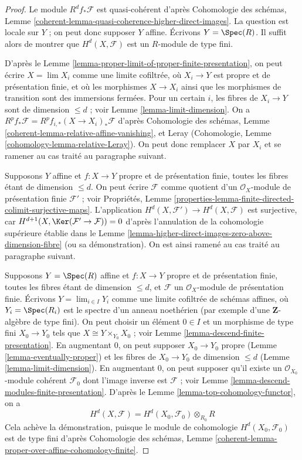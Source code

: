 \begin{proof}
Le module $R^df_*\mathcal{F}$ est quasi-cohérent d'après
Cohomologie des schémas, Lemme
\ref{coherent-lemma-quasi-coherence-higher-direct-images}.
La question est locale sur $Y$ ; on peut donc supposer $Y$ affine.
Écrivons $Y = \Spec(R)$. Il suffit alors de montrer que $H^d(X, \mathcal{F})$
est un $R$-module de type fini.

\medskip\noindent
D'après le Lemme \ref{lemma-proper-limit-of-proper-finite-presentation},
on peut écrire $X = \lim X_i$ comme une limite cofiltrée, où $X_i \to Y$ est propre
et de présentation finie, et où les morphismes $X \to X_i$
ainsi que les morphismes de transition sont des immersions fermées.
Pour un certain $i$, les fibres de $X_i \to Y$ sont de dimension $\leq d$ ;
voir Lemme \ref{lemma-limit-dimension}. On a
$R^pf_*\mathcal{F} = R^pf_{i, *}(X \to X_i)_*\mathcal{F}$ d'après
Cohomologie des schémas, Lemme \ref{coherent-lemma-relative-affine-vanishing},
et Leray (Cohomologie, Lemme \ref{cohomology-lemma-relative-Leray}).
On peut donc remplacer $X$ par $X_i$ et
se ramener au cas traité au paragraphe suivant.

\medskip\noindent
Supposons $Y$ affine et $f : X \to Y$ propre et de présentation finie,
toutes les fibres étant de dimension $\leq d$.
On peut écrire $\mathcal{F}$ comme quotient d'un
$\mathcal{O}_X$-module de présentation finie $\mathcal{F}'$ ; voir
Propriétés, Lemme
\ref{properties-lemma-finite-directed-colimit-surjective-maps}.
L'application $H^d(X, \mathcal{F}') \to H^d(X, \mathcal{F})$ est
surjective, car $H^{d + 1}(X, \Ker(\mathcal{F}' \to \mathcal{F})) = 0$
d'après l'annulation de la cohomologie supérieure établie dans le
Lemme \ref{lemma-higher-direct-images-zero-above-dimension-fibre}
(ou sa démonstration). On est ainsi ramené au cas traité au paragraphe suivant.

\medskip\noindent
Supposons $Y = \Spec(R)$ affine et $f : X \to Y$
propre et de présentation finie,
toutes les fibres étant de dimension $\leq d$, et $\mathcal{F}$ un
$\mathcal{O}_X$-module de présentation finie.
Écrivons $Y = \lim_{i \in I} Y_i$ comme une limite cofiltrée de schémas affines,
où $Y_i = \Spec(R_i)$ est le spectre d'un anneau noethérien
(par exemple d'une $\mathbf{Z}$-algèbre de type fini).
On peut choisir un élément $0 \in I$ et un morphisme de type fini
$X_0 \to Y_0$ tels que $X \cong Y \times_{Y_0} X_0$ ; voir
Lemme \ref{lemma-descend-finite-presentation}.
En augmentant $0$, on peut supposer $X_0 \to Y_0$ propre
(Lemme \ref{lemma-eventually-proper})
et les fibres de $X_0 \to Y_0$ de dimension $\leq d$
(Lemme \ref{lemma-limit-dimension}).
En augmentant $0$, on peut supposer qu'il existe un
$\mathcal{O}_{X_0}$-module cohérent $\mathcal{F}_0$ dont l'image
inverse est $\mathcal{F}$ ; voir
Lemme \ref{lemma-descend-modules-finite-presentation}.
D'après le Lemme \ref{lemma-top-cohomology-functor},
on a
$$
H^d(X, \mathcal{F}) = H^d(X_0, \mathcal{F}_0) \otimes_{R_0} R
$$
Cela achève la démonstration, puisque le module de cohomologie
$H^d(X_0, \mathcal{F}_0)$ est de type fini d'après
Cohomologie des schémas, Lemme
\ref{coherent-lemma-proper-over-affine-cohomology-finite}.
\end{proof}

